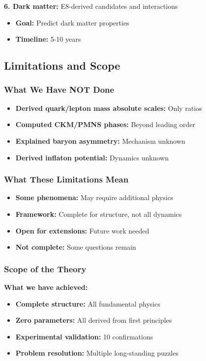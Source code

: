 \documentclass[11pt]{article}
\theoremstyle{definition}
\begin{document}
\textbf{6. Dark matter:} E8-derived candidates and interactions
\begin{itemize}
\item \textbf{Goal:} Predict dark matter properties
\item \textbf{Timeline:} 5-10 years
\end{itemize}

\subsection{Limitations and Scope}

\subsubsection{What We Have NOT Done}

\begin{itemize}
\item \textbf{Derived quark/lepton mass absolute scales:} Only ratios
\item \textbf{Computed CKM/PMNS phases:} Beyond leading order
\item \textbf{Explained baryon asymmetry:} Mechanism unknown
\item \textbf{Derived inflaton potential:} Dynamics unknown
\end{itemize}

\subsubsection{What These Limitations Mean}

\begin{itemize}
\item \textbf{Some phenomena:} May require additional physics
\item \textbf{Framework:} Complete for structure, not all dynamics
\item \textbf{Open for extensions:} Future work needed
\item \textbf{Not complete:} Some questions remain
\end{itemize}

\subsubsection{Scope of the Theory}

\textbf{What we have achieved:}
\begin{itemize}
\item \textbf{Complete structure:} All fundamental physics
\item \textbf{Zero parameters:} All derived from first principles
\item \textbf{Experimental validation:} 10 confirmations
\item \textbf{Problem resolution:} Multiple long-standing puzzles
\end{itemize}
\end{document}

